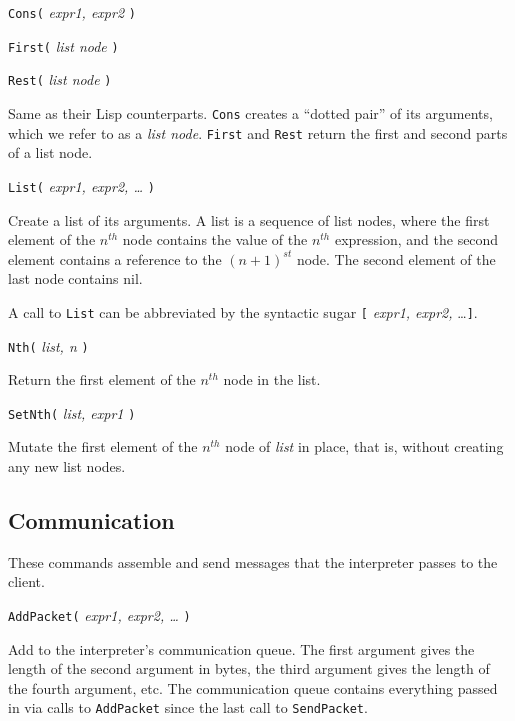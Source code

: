 \documentclass[12pt]{article}
\newenvironment{leftlines}
{\setlength{\oldindent}{\parindent}
 \setlength{\parindent}{0in}\vspace{\baselineskip}}
{\setlength{\parindent}{\oldindent}\vspace{\baselineskip}}
\begin{document}
\newlength{\oldindent}

\newcommand{\function}[2]{ {\tt #1(} {\em #2} {\tt )} }

\begin{leftlines}
\function{Cons}{expr1, expr2}

\function{First}{list node}

\function{Rest}{list node}
\end{leftlines}

Same as their Lisp counterparts.  {\tt Cons} creates a ``dotted pair'' of
its arguments, which we refer to as a {\em list node}.  {\tt First}
and {\tt Rest} return the first and second parts of a list node.

\begin{leftlines}
\function{List}{expr1, expr2, \ldots}
\end{leftlines}

Create a list of its arguments.  A list is a sequence of list nodes,
where the first element of the $n^{th}$ node contains the value of the
$n^{th}$ expression, and the second element contains a reference to
the $(n+1)^{st}$ node.  The second element of the last node contains
nil.

A call to {\tt List} can be abbreviated by the syntactic sugar {\tt [}
{\em expr1, expr2,} \ldots {\tt ]}.

\begin{leftlines}
\function{Nth}{list, n}
\end{leftlines}

Return the first element of the $n^{th}$ node in the list.

\begin{leftlines}
\function{SetNth}{list, expr1}
\end{leftlines}

Mutate the first element of the $n^{th}$ node of {\em list} in place, that is, without
creating any new list nodes.

\subsection{Communication}

These commands assemble and send messages that the interpreter passes
to the client.

\begin{leftlines}
\function{AddPacket}{expr1, expr2, \ldots}
\end{leftlines}

Add to the interpreter's communication queue.  The first argument
gives the length of the second argument in bytes, the third argument
gives the length of the fourth argument, etc.  The communication queue
contains everything passed in via calls to {\tt AddPacket} since the
last call to {\tt SendPacket}.
\end{document}
